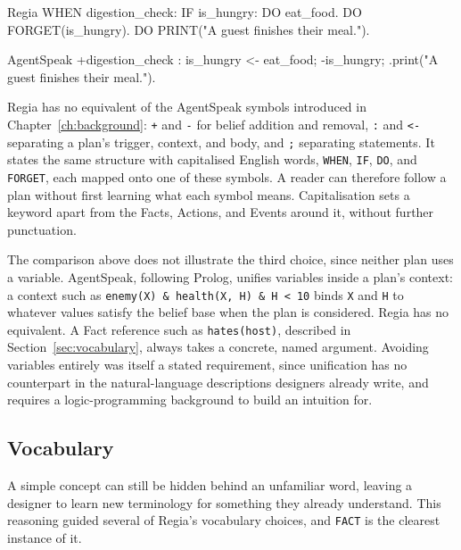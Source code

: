 \begin{codeblock}[]{Regia}
WHEN digestion_check:
    IF is_hungry:
        DO eat_food.
        DO FORGET(is_hungry).
        DO PRINT("A guest finishes their meal.").
\end{codeblock}
\label{lst:regia-digestion-check}

\begin{codeblock}[]{AgentSpeak}
+digestion_check : is_hungry <-
    eat_food;
    -is_hungry;
    .print("A guest finishes their meal.").
\end{codeblock}

Regia has no equivalent of the AgentSpeak symbols introduced in Chapter~\ref{ch:background}: \lstinline|+| and \lstinline|-| for belief addition and removal, \lstinline|:| and \lstinline|<-| separating a plan's trigger, context, and body, and \lstinline|;| separating statements. It states the same structure with capitalised English words, \lstinline|WHEN|, \lstinline|IF|, \lstinline|DO|, and \lstinline|FORGET|, each mapped onto one of these symbols. A reader can therefore follow a plan without first learning what each symbol means. Capitalisation sets a keyword apart from the Facts, Actions, and Events around it, without further punctuation.

The comparison above does not illustrate the third choice, since neither plan uses a variable. AgentSpeak, following Prolog, unifies variables inside a plan's context: a context such as \lstinline|enemy(X) & health(X, H) & H < 10| binds \lstinline|X| and \lstinline|H| to whatever values satisfy the belief base when the plan is considered. Regia has no equivalent. A Fact reference such as \lstinline|hates(host)|, described in Section~\ref{sec:vocabulary}, always takes a concrete, named argument. Avoiding variables entirely was itself a stated requirement, since unification has no counterpart in the natural-language descriptions designers already write, and requires a logic-programming background to build an intuition for.

\subsection{Vocabulary}
A simple concept can still be hidden behind an unfamiliar word, leaving a designer to learn new terminology for something they already understand. This reasoning guided several of Regia's vocabulary choices, and \lstinline|FACT| is the clearest instance of it.
 
